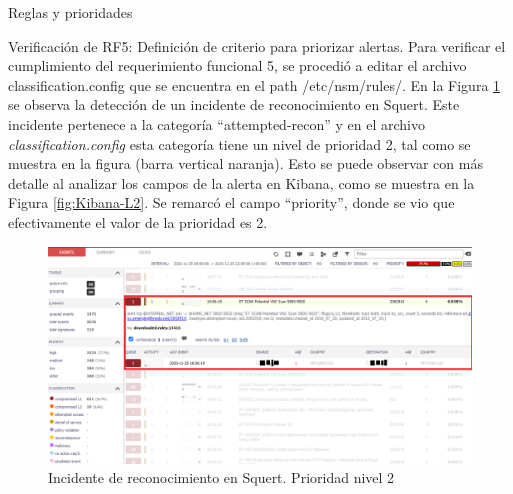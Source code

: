 \begin{section}{Reglas y prioridades}
\begin{section}{Verificación de RF5: Definición de criterio para priorizar alertas.}
    Para verificar el cumplimiento del requerimiento funcional 5, se procedió a editar el archivo  classification.config que se encuentra en el path /etc/nsm/rules/. En la Figura \ref{fig:squert-L2} se observa la detección de un incidente de reconocimiento en Squert. Este incidente pertenece a la categoría “attempted-recon” y en el archivo \textit{classification.config} esta categoría tiene un nivel de prioridad 2, tal como se muestra en la figura (barra vertical naranja). Esto se puede observar con más detalle al analizar los campos de la alerta en Kibana, como se muestra en la Figura \ref{fig:Kibana-L2}. Se remarcó el campo “priority”, donde se vio que efectivamente el valor de la prioridad es 2.
    \begin{figure}[H]
        \centering
        \includegraphics[width=1\textwidth]{./iteracion_3_imagenes/squert_ataque_vnc_L2-EDITADO.png}
        \caption{Incidente de reconocimiento en Squert. Prioridad nivel 2}
        \label{fig:squert-L2}
    \end{figure}
    \begin{figure}[H]
        \centering

\end{figure}
\end{section}
\end{section}
